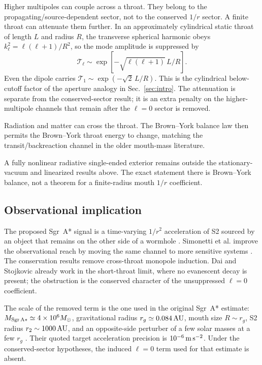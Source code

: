 \documentclass[aps,prd,10pt,onecolumn,nofootinbib,superscriptaddress,floatfix]{revtex4-2}
\begin{document}
Higher multipoles can couple across a throat.  They belong to the
propagating/source-dependent sector, not to the conserved $1/r$ sector.  A
finite throat can attenuate them further.  In an approximately cylindrical
static throat of length $L$ and radius $R$, the transverse spherical harmonic obeys
$k_\ell^2=\ell(\ell+1)/R^2$, so the mode amplitude is suppressed by
\begin{equation}
  \mathcal T_\ell \sim
  \exp\!\left[-\sqrt{\ell(\ell+1)}\,L/R\right].
\end{equation}
Even the dipole carries $\mathcal T_1\sim \exp(-\sqrt2\,L/R)$.  This
is the cylindrical below-cutoff factor of the aperture analogy in
Sec.~\ref{sec:intro}.  The attenuation is separate from the conserved-sector
result; it is an extra penalty on the higher-multipole channels that remain
after the $\ell=0$ sector is removed.

Radiation and matter can cross the throat.  The Brown--York balance law then
permits the Brown--York throat energy to change, matching the
transit/backreaction channel in the older mouth-mass literature.

A fully nonlinear radiative single-ended exterior remains outside the
stationary-vacuum and linearized results above.  The exact statement there is
Brown--York balance, not a theorem for a finite-radius mouth $1/r$
coefficient.

\subsection{Observational implication}

The proposed Sgr~A* signal is a time-varying $1/r^2$ acceleration of S2 sourced
by an object that remains on the other side of a wormhole
\cite{DaiStojkovic2019Observing}.  Simonetti et al. improve the observational
reach by moving the same channel to more sensitive systems
\cite{SimonettiEtAl2021SensitiveSearches}.  The conservation results remove
cross-throat monopole induction.  Dai and Stojkovic already work in the
short-throat limit, where no evanescent decay is present; the obstruction is
the conserved character of the unsuppressed $\ell=0$ coefficient.

The scale of the removed term is the one used in the original Sgr~A* estimate:
$M_{\rm Sgr\,A*}\simeq4\times10^6M_\odot$, gravitational radius
$r_g\simeq0.084\,{\rm AU}$, mouth size $R\sim r_g$, S2 radius
$r_2\sim1000\,{\rm AU}$, and an opposite-side perturber of a few solar masses at a few
$r_g$ \cite{DaiStojkovic2019Observing}.  Their quoted target acceleration
precision is $10^{-6}\,{\rm m\,s^{-2}}$.  Under the conserved-sector
hypotheses, the induced $\ell=0$ term used for that estimate is absent.
\end{document}
